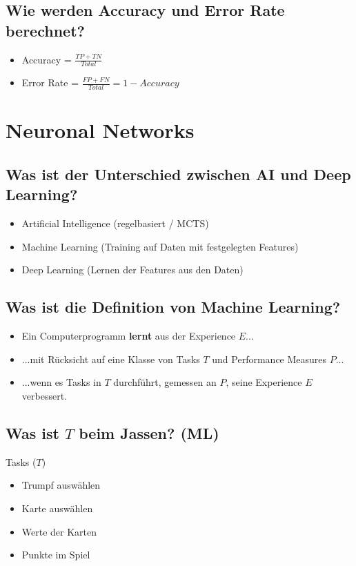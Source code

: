 \documentclass[a4paper]{article}
\begin{document}
		\subsection{Wie werden Accuracy und Error Rate berechnet?}
		
		\begin{itemize}
			\item Accuracy = $\frac{TP + TN}{Total}$\\
			\item Error Rate = $\frac{FP + FN}{Total} = 1 - Accuracy$
		\end{itemize}
	
	\section{Neuronal Networks}
	
		\subsection{Was ist der Unterschied zwischen AI und Deep Learning?}
		
		\begin{itemize}
			\item Artificial Intelligence (regelbasiert / MCTS)
			\item Machine Learning (Training auf Daten mit festgelegten Features)
			\item Deep Learning (Lernen der Features aus den Daten)
		\end{itemize}
	
		\subsection{Was ist die Definition von Machine Learning?}
		
		\begin{itemize}
			\item Ein Computerprogramm \textbf{lernt} aus der Experience $E$...
			\item ...mit Rücksicht auf eine Klasse von Tasks $T$ und Performance Measures $P$...
			\item ...wenn es Tasks in $T$ durchführt, gemessen an $P$, seine Experience $E$ verbessert.
		\end{itemize}
	
		\subsection{Was ist $T$ beim Jassen? (ML)} 
		
		Tasks ($T$)
		\begin{itemize}
			\item Trumpf auswählen
			\item Karte auswählen
			\item Werte der Karten
			\item Punkte im Spiel
		\end{itemize}
		
		
		
		
		
		
		
	
\end{document}
